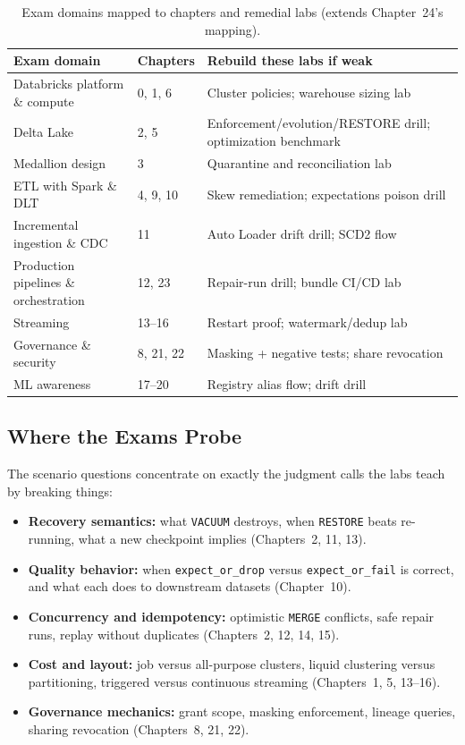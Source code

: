 \begin{table}[H]
\centering
\small
\begin{tabular}{@{}p{4.6cm}p{3.2cm}p{5.0cm}@{}}
\toprule
\textbf{Exam domain} & \textbf{Chapters} & \textbf{Rebuild these labs if weak} \\
\midrule
Databricks platform \& compute & 0, 1, 6 & Cluster policies; warehouse sizing lab \\
Delta Lake & 2, 5 & Enforcement/evolution/RESTORE drill; optimization benchmark \\
Medallion design & 3 & Quarantine and reconciliation lab \\
ETL with Spark \& DLT & 4, 9, 10 & Skew remediation; expectations poison drill \\
Incremental ingestion \& CDC & 11 & Auto Loader drift drill; SCD2 flow \\
Production pipelines \& orchestration & 12, 23 & Repair-run drill; bundle CI/CD lab \\
Streaming & 13--16 & Restart proof; watermark/dedup lab \\
Governance \& security & 8, 21, 22 & Masking + negative tests; share revocation \\
ML awareness & 17--20 & Registry alias flow; drift drill \\
\bottomrule
\end{tabular}
\caption{Exam domains mapped to chapters and remedial labs (extends Chapter~24's mapping).}
\label{tab:appendixe-domains}
\end{table}

\subsection{Where the Exams Probe}
The scenario questions concentrate on exactly the judgment calls the labs teach by breaking
things:
\begin{itemize}
    \item \textbf{Recovery semantics:} what \texttt{VACUUM} destroys, when \texttt{RESTORE}
    beats re-running, what a new checkpoint implies (Chapters~2, 11, 13).
    \item \textbf{Quality behavior:} when \texttt{expect\_or\_drop} versus
    \texttt{expect\_or\_fail} is correct, and what each does to downstream datasets
    (Chapter~10).
    \item \textbf{Concurrency and idempotency:} optimistic \texttt{MERGE} conflicts, safe
    repair runs, replay without duplicates (Chapters~2, 12, 14, 15).
    \item \textbf{Cost and layout:} job versus all-purpose clusters, liquid clustering versus
    partitioning, triggered versus continuous streaming (Chapters~1, 5, 13--16).
    \item \textbf{Governance mechanics:} grant scope, masking enforcement, lineage queries,
    sharing revocation (Chapters~8, 21, 22).
\end{itemize}

